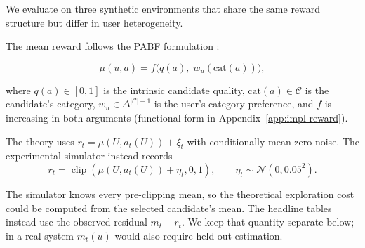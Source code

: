 \documentclass{article} %
\begin{document}
\label{sec:exp-setup}

We evaluate on three synthetic environments that share the same reward structure but differ in user heterogeneity.

The mean reward follows the PABF formulation \citep{jin2026personalizing}:

\begin{equation}
\label{eq:exp-mu}
\mu(u,a) = f\bigl(q(a),\; w_u(\mathrm{cat}(a))\bigr),
\end{equation}

where $q(a)\in[0,1]$ is the intrinsic candidate quality, $\mathrm{cat}(a)\in\mathcal{C}$ is the candidate's category, $w_u\in\Delta^{|\mathcal{C}|-1}$ is the user's category preference, and $f$ is increasing in both arguments (functional form in Appendix~\ref{app:impl-reward}).

The theory uses $r_t=\mu(U,a_t(U))+\xi_t$ with conditionally mean-zero noise. The experimental simulator instead records
\begin{equation}
\label{eq:exp-clipped-reward}
r_t=\operatorname{clip}\!\left(\mu(U,a_t(U))+\eta_t,0,1\right),
\qquad
\eta_t\sim\mathcal N(0,0.05^2).
\end{equation}

The simulator knows every pre-clipping mean, so the theoretical exploration cost could be computed from the selected candidate's mean. The headline tables instead use the observed residual \(m_t-r_t\). We keep that quantity separate below; in a real system \(m_t(u)\) would also require held-out estimation.
\end{document}
